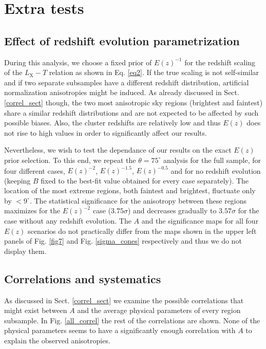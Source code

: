 \documentclass{aa}   %
\begin{document}
\newpage

\appendix

\section{Extra tests}\label{extra_tests}

\subsection{Effect of redshift evolution parametrization}\label{Ez_prior}

During this analysis, we choose a fixed prior of $E(z)^{-1}$ for the redshift scaling of the $L_{\text{X}}-T$ relation as shown in Eq. \ref{eq2}. If the true scaling is not self-similar and if two separate subsamples have a different redshift distribution, artificial normalization anisotropies might be induced. As already discussed in Sect. \ref{correl_sect} though, the two most anisotropic sky regions (brightest and faintest) share a similar redshift distributions and are not expected to be affected by such possible biases. Also, the cluster redshifts are relatively low and thus $E(z)$ does not rise to high values in order to significantly affect our results.

Nevertheless, we wish to test the dependance of our results on the exact $E(z)$ prior selection. To this end, we repeat the $\theta=75^{\circ}$ analysis for the full sample, for four different cases, $E(z)^{-2}$, $E(z)^{-1.5}$, $E(z)^{-0.5}$ and for no redshift evolution (keeping $B$ fixed to the best-fit value obtained for every case separately). The location of the most extreme regions, both faintest and brightest, fluctuate only by $<9^{\circ}$. The statistical significance for the anisotropy between these regions maximizes for the $E(z)^{-2}$ case ($3.75\sigma$) and decreases gradually to $3.57\sigma$ for the case without any redshift evolution. The $A$ and the significance maps for all four $E(z)$ scenarios do not practically differ from the maps shown in the upper left panels of Fig. \ref{fig7} and Fig. \ref{sigma_cones} respectively and thus we do not display them.




\subsection{Correlations and systematics}\label{correl_append}

As discussed in Sect. \ref{correl_sect} we examine the possible correlations that might exist between $A$ and the average physical parameters of every region subsample. In Fig. \ref{all_correl} the rest of the correlations are shown. None of the physical parameters seems to have a significantly enough correlation with $A$ to explain the observed anisotropies.
\end{document}
